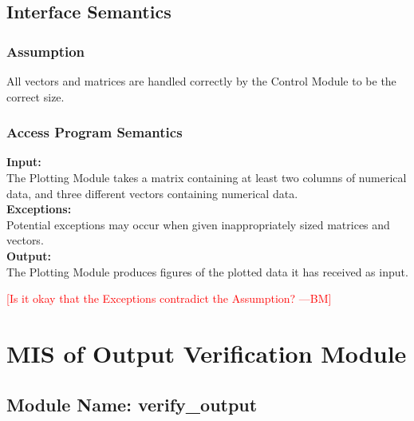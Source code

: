 \documentclass[12pt]{article}
\newcommand{\authornote}[3]{\textcolor{#1}{[#3 ---#2]}}
\newcommand{\authornote}[3]{}
\newcommand{\bmac}[1]{\authornote{red}{BM}{#1}}
\begin{document}
\subsection{Interface Semantics}


\subsubsection{Assumption}
All vectors and matrices are handled correctly by the Control Module to be the correct size.


\subsubsection{Access Program Semantics}
\noindent \textbf{Input:}\\
The Plotting Module takes a matrix containing at least two columns of numerical
data, and three different vectors containing numerical data.\\

\noindent \textbf{Exceptions:}\\
Potential exceptions may occur when given inappropriately sized
matrices and vectors.\\

\noindent \textbf{Output:}\\
The Plotting Module produces figures of the plotted data it has received as input.

\bmac{Is it okay that the Exceptions contradict the Assumption?}


\section{MIS of Output Verification Module}

\subsection{Module Name: verify\_output}
\end{document}
